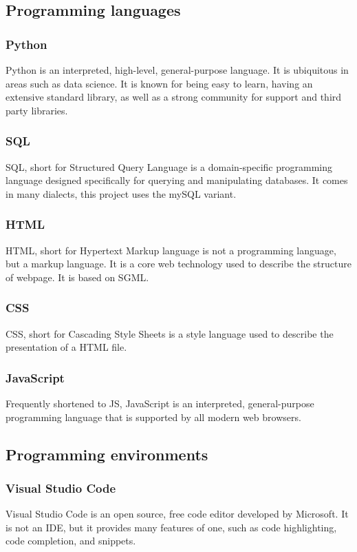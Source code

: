     \subsection{Programming languages}
        \subsubsection{Python}
        Python is an interpreted, high-level, general-purpose language. It is ubiquitous in areas such as data science. It is known for being easy to learn, having an extensive standard library, as well as a strong community for support and third party libraries.
        \subsubsection{SQL}
        SQL, short for Structured Query Language is a domain-specific programming language designed specifically for querying and manipulating databases. It comes in many dialects, this project uses the mySQL variant.
        \subsubsection{HTML} 
        HTML, short for Hypertext Markup language is not a programming language, but a markup language. It is a core web technology used to describe the structure of webpage. It is based on SGML.
        \subsubsection{CSS}
        CSS, short for Cascading Style Sheets is a style language used to describe the presentation of a HTML file.
        \subsubsection{JavaScript}
        Frequently shortened to JS, JavaScript is an interpreted, general-purpose programming language that is supported by all modern web browsers.
    \subsection{Programming environments}
        \subsubsection{Visual Studio Code}
        Visual Studio Code is an open source, free code editor developed by Microsoft. It is not an IDE, but it provides many features of one, such as code highlighting, code completion, and snippets.
